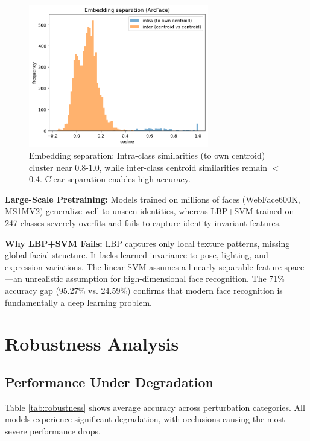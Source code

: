 \documentclass[11pt,a4paper]{article}
\begin{document}
\begin{figure}[H]
    \centering
    \includegraphics[width=0.7\textwidth]{runs/eda/intra_inter_cosine.png}
    \caption{Embedding separation: Intra-class similarities (to own centroid) cluster near 0.8-1.0, while inter-class centroid similarities remain $<$0.4. Clear separation enables high accuracy.}
    \label{fig:embeddings}
\end{figure}

\textbf{Large-Scale Pretraining:} Models trained on millions of faces (WebFace600K, MS1MV2) generalize well to unseen identities, whereas LBP+SVM trained on 247 classes severely overfits and fails to capture identity-invariant features.

\textbf{Why LBP+SVM Fails:} LBP captures only local texture patterns, missing global facial structure. It lacks learned invariance to pose, lighting, and expression variations. The linear SVM assumes a linearly separable feature space—an unrealistic assumption for high-dimensional face recognition. The 71\% accuracy gap (95.27\% vs. 24.59\%) confirms that modern face recognition is fundamentally a deep learning problem.

\section{Robustness Analysis}

\subsection{Performance Under Degradation}

Table \ref{tab:robustness} shows average accuracy across perturbation categories. All models experience significant degradation, with occlusions causing the most severe performance drops.
\end{document}
